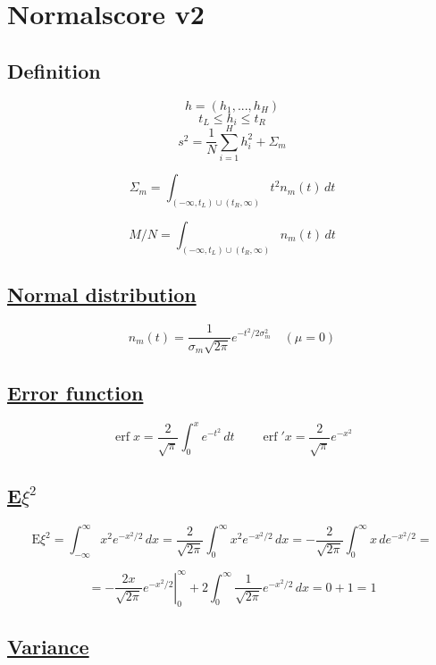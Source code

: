 \documentclass[12pt]{article}
\begin{document}
\section*{Normalscore v2}

\subsection*{Definition}

\[ h = (h_1, ..., h_H) \]
\[ t_L \leq h_i \leq t_R \]
\[
s^2 =
\frac{1}{N} \sum_{i = 1}^{H} h_i^2 + \Sigma_m
\]

\begin{equation}
\Sigma_m = \int_{(-\infty, t_L) \cup (t_R, \infty)} t^2 n_m(t) \,dt
\label{eq:def_Sigma_m}
\end{equation}

\[
M / N = \int_{(-\infty, t_L) \cup (t_R, \infty)} n_m(t) \,dt
\]

\subsection*{\href{https://en.wikipedia.org/wiki/Normal_distribution}{Normal distribution}}

\[
n_m(t) = \frac{1}{\sigma_m\sqrt{2 \pi }} e^{-t^2/2\sigma_m^2} \quad (\mu = 0)
\]

\subsection*{\href{https://en.wikipedia.org/wiki/Error_function}{Error function}}

\[
\operatorname{erf} x = \frac{2}{\sqrt{\pi}} \int_{0}^{x} e^{-t^2} \,dt
\quad\quad
\operatorname{erf}'x = \frac{2}{\sqrt{\pi}} e^{-x^{2}}
\]

\subsection*{\href{https://tvims.nsu.ru/chernova/tv/lec/node46.htmln}{E\(\xi^2\)}}

\[
\text{E}\xi^2 = \int_{-\infty}^{\infty} x^2 e^{-x^2/2} \,dx =
\frac{2}{\sqrt{2\pi}} \int_{0}^{\infty} x^2 e^{-x^2/2} \,dx =
-\frac{2}{\sqrt{2\pi}} \int_{0}^{\infty} x \,de^{-x^2/2} =
\]

\[
= \left. -\frac{2x}{\sqrt{2\pi}} e^{-x^2/2} \right|_0^\infty +
2 \int_{0}^{\infty} \frac{1}{\sqrt{2\pi}} e^{-x^2/2} \,dx = 0 + 1 = 1
\]

\subsection*{\href{https://en.wikipedia.org/wiki/Variance}{Variance}}
\end{document}
